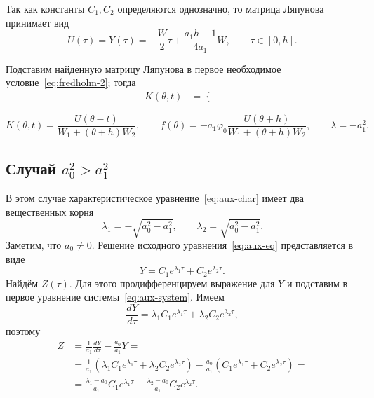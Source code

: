 \documentclass[a4paper,14pt]{article}
\theoremstyle{definition}
\begin{document}
Так как константы $C_1, C_2$ определяются однозначно, то матрица
Ляпунова принимает вид~\cite[стр.~49]{kharitonov2013}
\begin{equation*}
  U(\tau) = Y(\tau)
  = - \frac{W}{2} \tau + \frac{a_1 h - 1}{4 a_1} W,
  \qquad \tau \in [0, h].
\end{equation*}

Подставим найденную матрицу Ляпунова в первое необходимое
условие~\eqref{eq:fredholm-2}; тогда
\begin{equation*}
  \begin{aligned}
    K(\theta, t)
    &=
      \begin{cases}
      \end{cases}
  \end{aligned}
\end{equation*}

\begin{equation*}
  K(\theta, t)
  =
  \frac{U(\theta - t)}{W_1 + (\theta + h) W_2},
  \qquad
  f(\theta)
  =
  - a_1 \varphi_0
  \frac{U(\theta + h)}{W_1 + (\theta + h) W_2},
  \qquad
  \lambda = -a_1^2.
\end{equation*}

\newpage
\subsection{Случай $a_0^2 > a_1^2$}

В этом случае характеристическое уравнение~\eqref{eq:aux-char}
имеет два вещественных корня
\begin{equation*}
  \lambda_1 = - \sqrt{ a_0^2 - a_1^2 },
  \qquad
  \lambda_2 = \sqrt{ a_0^2 - a_1^2 }.
\end{equation*}
Заметим, что $a_0 \neq 0$. Решение исходного
уравнения~\eqref{eq:aux-eq} представляется в виде
\begin{equation*}
  Y = C_1 e^{\lambda_1 \tau} + C_2 e^{\lambda_2 \tau}.
\end{equation*}
Найдём $Z(\tau)$. Для этого продифференцируем выражение для $Y$
и подставим в первое уравнение системы~\eqref{eq:aux-system}.
Имеем
\begin{equation*}
  \frac{d Y}{d \tau}
  = \lambda_1 C_1 e^{\lambda_1 \tau}
  + \lambda_2 C_2 e^{\lambda_2 \tau},
\end{equation*}
поэтому
\begin{equation*}
  \begin{aligned}
    Z
    &=
      \frac{1}{a_1} \frac{d Y}{d \tau} - \frac{a_0}{a_1} Y = \\
    &=
      \frac{1}{a_1} \left(
      \lambda_1 C_1 e^{\lambda_1 \tau}
      + \lambda_2 C_2 e^{\lambda_2 \tau}
      \right)
      - \frac{a_0}{a_1} \left(
      C_1 e^{\lambda_1 \tau} + C_2 e^{\lambda_2 \tau}
      \right) = \\
    &=
      \frac{\lambda_1 - a_0}{a_1} C_1 e^{\lambda_1 \tau}
      +
      \frac{\lambda_2 - a_0}{a_1} C_2 e^{\lambda_2 \tau}.
  \end{aligned}
\end{equation*}
\end{document}
